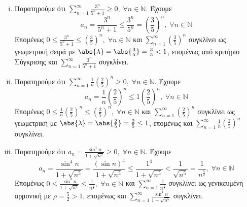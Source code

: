 \begin{enumerate}
\begin{enumerate}[i)]
      \item Παρατηρούμε ότι $ \sum_{n=1}^{\infty} \frac{3^{n}}{5^{n}+1} \geq 0, 
        \; \forall n \in \mathbb{N}$. Έχουμε
        \[
          a_{n} = \frac{3^{n}}{5^{n}+1} \leq \frac{3^{n}}{5^{n}} = 
          \left(\frac{3}{5}\right)^{n}, \; \forall n \in \mathbb{N} 
        \] 
        Επομένως $ 0 \leq \frac{3^{n}}{5^{n}+1} \leq \left(\frac{3}{5} \right)^{n},
        \; \forall n \in \mathbb{N} $ και $ \sum_{n=1}^{\infty} 
        \left(\frac{3}{5} \right)^{n}$
        συγκλίνει ως γεωμετρική σειρά με $ \abs{\lambda} = \abs{\frac{3}{5}} = 
        \frac{3}{5} < 1 $, επομένως από κριτήριο Σύγκρισης και 
        $ \sum_{n=1}^{\infty} \frac{3^{n}}{5^{n}+1} $ συγκλίνει.

      \item Παρατηρούμε ότι $ \sum_{n=1}^{\infty} \frac{1}{n} 
        \left(\frac{2}{5} \right)^{n} \geq 0, \; \forall n \in \mathbb{N} $. Έχουμε
        \[
          a_{n} = \frac{1}{n} \left(\frac{2}{5} \right)^{n} \leq 1
          \left(\frac{2}{5} \right)^{n}, \; \forall n \in \mathbb{N}
        \] 
        Επομένως $ 0 \leq \frac{1}{n} \left(\frac{2}{5} \right)^{n} \leq 
        \left(\frac{2}{5}\right)^{n}, \; \forall n \in \mathbb{N}$ και 
        $ \sum_{n=1}^{\infty} \left(\frac{2}{5} \right)^{n} $ συγκλίνει 
        ως γεωμετρική με $ \abs{\lambda} = \abs{\frac{2}{5}} = \frac{2}{5} \leq 1$,
        επομένως και $ \sum_{n=1}^{\infty} \frac{1}{n} \left(\frac{2}{5} 
        \right)^{n} $ συγκλίνει.

      \item Παρατηρούμε ότι $ a_{n} = \frac{\sin^{4}{n}}{1+ \sqrt{n^{5}}} \geq 0, 
        \; \forall n \in \mathbb{N}$. Έχουμε
        \[
          a_{n} =  \frac{\sin^{4}{n}}{1+ \sqrt{n^{5}}} = \frac{(\sin{n} )^{4}}{1+
          \sqrt{n^{5}}} \leq \frac{1^{4}}{1+ \sqrt{n^{5}}} < 
          \frac{1}{\sqrt{n^{5}}} = \frac{1}{n^{\frac{5}{2}}}, \; 
          \forall n \in \mathbb{N}
        \] 
        Επομένως $ 0 \leq \frac{\sin^{4}{n}}{1 + \sqrt{n^{5}}} \leq
        \frac{1}{n^{\frac{5}{2}}}, \; \forall n \in \mathbb{N} $ και 
        $ \sum_{n=1}^{\infty} \frac{1}{n^{\frac{5}{2}}} $ συγκλίνει ως 
        γενικευμένη αρμονική με $ \rho = \frac{5}{2} > 1 $, επομένως και 
        $ \sum_{n=1}^{\infty} \frac{\sin^{4}{n}}{1 + \sqrt{n^{5}}} $ συγκλίνει.


\end{enumerate}
\end{enumerate}
